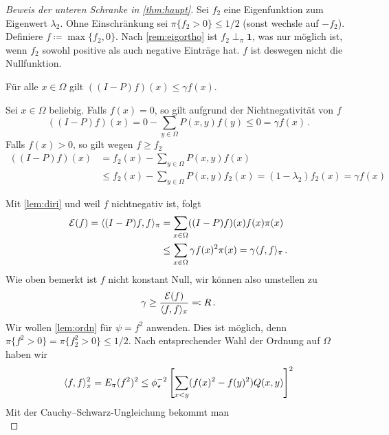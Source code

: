 \documentclass[ngerman,a4paper,11pt]{scrartcl}
\newcommand{\diri}{\mathcal{E}}
\DeclarePairedDelimiter{\sprod}{\langle}{\rangle}	%
\begin{document}
\begin{proof}[Beweis der unteren Schranke in \cref{thm:haupt}]
 Sei $f_2$ eine Eigenfunktion zum Eigenwert $\lambda_2$. Ohne Einschränkung sei
 $\pi\{f_2>0\}\leq 1/2$ (sonst wechsle auf $-f_2$). \\
 Definiere $f\coloneqq\max\{f_2,0\}$.
 Nach \cref{rem:eigortho} ist $f_2\perp_\pi\mathbf{1}$, was nur möglich ist, wenn
 $f_2$ sowohl positive als auch negative Einträge hat. $f$ ist deswegen nicht die Nullfunktion.
 \begin{claim}
  Für alle $x\in\Omega$ gilt $((I-P)f)(x)\leq\gamma f(x)$.
 \end{claim}
 \begin{dproof}
  Sei $x\in\Omega$ beliebig. Falls $f(x)=0$, so gilt aufgrund der Nichtnegativität von $f$
  \begin{equation*}
   ((I-P)f)(x)=0-\sum_{y\in\Omega}P(x,y)f(y)\leq 0=\gamma f(x)\, . 
  \end{equation*}
  Falls $f(x)>0$, so gilt wegen $f\geq f_2$
  \begin{align*}
   ((I-P)f)(x)&=f_2(x)-\sum_{y\in\Omega}P(x,y)f(x) \\
   &\leq f_2(x)-\sum_{y\in\Omega}P(x,y)f_2(x)=(1-\lambda_2)f_2(x)=\gamma f(x)
  \end{align*} 
 \end{dproof}
 Mit \cref{lem:diri} und weil $f$ nichtnegativ ist, folgt
 \begin{align*}
  \begin{split}
   \diri(f)=\sprod{(I-P)f,f}_\pi&=\sum_{x\in\Omega}((I-P)f)(x)f(x)\pi(x) \\
   &\leq \sum_{x\in\Omega}\gamma f(x)^2\pi(x)=\gamma\sprod{f,f}_\pi\, .
  \end{split}
 \end{align*}
 Wie oben bemerkt ist $f$ nicht konstant Null, wir können also umstellen zu
 \begin{equation}
  \label{eq:R}
  \gamma\geq\frac{\diri(f)}{\sprod{f,f}_\pi}\eqqcolon R\, . 
 \end{equation}
 Wir wollen \cref{lem:ordn} für $\psi=f^2$ anwenden. Dies ist möglich, denn
 $\pi\{f^2>0\}=\pi\{f_2^2>0\}\leq 1/2$. Nach entsprechender Wahl der Ordnung auf
 $\Omega$ haben wir
 \begin{equation*}
  \sprod{f,f}_\pi^2=E_\pi(f^2)^2\leq\phi_\star^{-2}\left[ \sum_{x<y}(f(x)^2-f(y)^2)Q(x,y) \right]^2
 \end{equation*}
 Mit der Cauchy--Schwarz-Ungleichung bekommt man
 \begin{equation}

\end{equation}
\end{proof}
\end{document}
